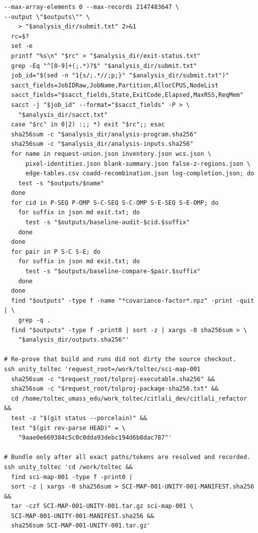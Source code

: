 \documentclass[11pt]{article}
\begin{document}
\begin{small}
\begin{verbatim}
--max-array-elements 0 --max-records 2147483647 \
--output \"$outputs\"" \
    > "$analysis_dir/submit.txt" 2>&1
  rc=$?
  set -e
  printf "%s\n" "$rc" > "$analysis_dir/exit-status.txt"
  grep -Eq "^[0-9]+(;.*)?$" "$analysis_dir/submit.txt"
  job_id="$(sed -n "1{s/;.*//;p;}" "$analysis_dir/submit.txt")"
  sacct_fields=JobIDRaw,JobName,Partition,AllocCPUS,NodeList
  sacct_fields="$sacct_fields,State,ExitCode,Elapsed,MaxRSS,ReqMem"
  sacct -j "$job_id" --format="$sacct_fields" -P > \
    "$analysis_dir/sacct.txt"
  case "$rc" in 0|2) :;; *) exit "$rc";; esac
  sha256sum -c "$analysis_dir/analysis-program.sha256"
  sha256sum -c "$analysis_dir/analysis-inputs.sha256"
  for name in request-union.json inventory.json wcs.json \
      pixel-identities.json blank-summary.json false-z-regions.json \
      edge-tables.csv coadd-recombination.json log-completion.json; do
    test -s "$outputs/$name"
  done
  for cid in P-SEQ P-OMP S-C-SEQ S-C-OMP S-E-SEQ S-E-OMP; do
    for suffix in json md exit.txt; do
      test -s "$outputs/baseline-audit-$cid.$suffix"
    done
  done
  for pair in P S-C S-E; do
    for suffix in json md exit.txt; do
      test -s "$outputs/baseline-compare-$pair.$suffix"
    done
  done
  find "$outputs" -type f -name "*covariance-factor*.npz" -print -quit | \
    grep -q .
  find "$outputs" -type f -print0 | sort -z | xargs -0 sha256sum > \
    "$analysis_dir/outputs.sha256"'

# Re-prove that build and runs did not dirty the source checkout.
ssh unity_toltec 'request_root=/work/toltec/sci-map-001
  sha256sum -c "$request_root/tolproj-executable.sha256" &&
  sha256sum -c "$request_root/tolproj-package-sha256.txt" &&
  cd /home/toltec_umass_edu/work_toltec/citlali_dev/citlali_refactor &&
  test -z "$(git status --porcelain)" &&
  test "$(git rev-parse HEAD)" = \
    "9aae0e669384c5c0c0dda93debc194d6b8dac787"'

# Bundle only after all exact paths/tokens are resolved and recorded.
ssh unity_toltec 'cd /work/toltec &&
  find sci-map-001 -type f -print0 |
  sort -z | xargs -0 sha256sum > SCI-MAP-001-UNITY-001-MANIFEST.sha256 &&
  tar -czf SCI-MAP-001-UNITY-001.tar.gz sci-map-001 \
  SCI-MAP-001-UNITY-001-MANIFEST.sha256 &&
  sha256sum SCI-MAP-001-UNITY-001.tar.gz'
\end{verbatim}
\end{small}
\end{document}
